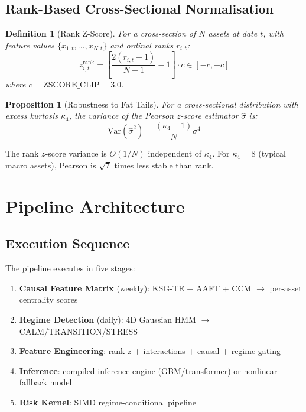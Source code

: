 \documentclass[11pt]{article}
\newtheorem{definition}{Definition}
\newtheorem{proposition}{Proposition}
\begin{document}
\subsection{Rank-Based Cross-Sectional Normalisation}

\begin{definition}[Rank Z-Score]
For a cross-section of $N$ assets at date $t$, with feature values $\{x_{1,t}, \ldots, x_{N,t}\}$ and ordinal ranks $r_{i,t}$:
\begin{equation}
z_{i,t}^{\text{rank}} = \left[\frac{2(r_{i,t}-1)}{N-1} - 1\right] \cdot c \in [-c, +c]
\label{eq:rank-zscore}
\end{equation}
where $c = \text{ZSCORE\_CLIP} = 3.0$.
\end{definition}

\begin{proposition}[Robustness to Fat Tails]
For a cross-sectional distribution with excess kurtosis $\kappa_4$, the variance of the Pearson $z$-score estimator $\hat{\sigma}$ is:
\begin{equation}
\text{Var}(\hat{\sigma}^2) = \frac{(\kappa_4 - 1)}{N} \sigma^4
\label{eq:pearson-var}
\end{equation}
\end{proposition}
The rank $z$-score variance is $O(1/N)$ independent of $\kappa_4$. For $\kappa_4 = 8$ (typical macro assets), Pearson is $\sqrt{7}$ times less stable than rank.

\section{Pipeline Architecture}

\subsection{Execution Sequence}

The pipeline executes in five stages:
\begin{enumerate}
\item \textbf{Causal Feature Matrix} (weekly): KSG-TE + AAFT + CCM $\to$ per-asset centrality scores
\item \textbf{Regime Detection} (daily): 4D Gaussian HMM $\to$ CALM/TRANSITION/STRESS
\item \textbf{Feature Engineering}: rank-z + interactions + causal + regime-gating
\item \textbf{Inference}: compiled inference engine (GBM/transformer) or nonlinear fallback model
\item \textbf{Risk Kernel}: SIMD regime-conditional pipeline
\end{enumerate}
\end{document}
